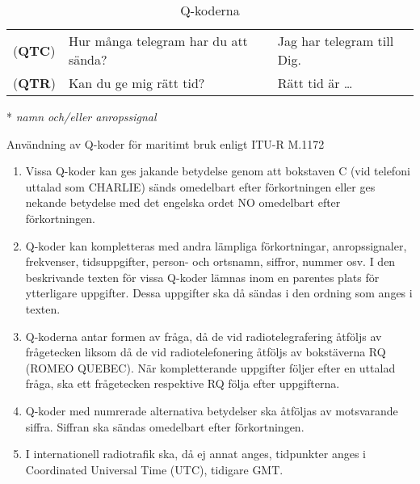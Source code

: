 \begin{table*}
\begin{threeparttable}
\begin{tabular}{lp{6cm}p{6cm}}
    (\textbf{QTC}) & Hur många telegram har du att sända? & Jag har telegram till Dig. \\
    (\textbf{QTR}) & Kan du ge mig rätt tid? & Rätt tid är \dots \\
  \end{tabular}
  \vspace{1em}
  \begin{tablenotes}
  \item [*] \emph{namn och/eller anropssignal}
  \end{tablenotes}
  \end{threeparttable}
  \caption{Q-koderna}
	\label{tab:q-kod}
\end{table*}

Användning av Q-koder för maritimt bruk enligt ITU-R M.1172
\begin{enumerate}
	\item Vissa Q-koder kan ges jakande betydelse genom att bokstaven C
	(vid telefoni uttalad som CHARLIE) sänds omedelbart efter
	förkortningen eller ges nekande betydelse med det engelska ordet NO
	omedelbart efter förkortningen.
	\item Q-koder kan kompletteras med andra lämpliga förkortningar,
	anropssignaler, frekvenser, tidsuppgifter, person- och ortsnamn,
	siffror, nummer osv. I den beskrivande texten för vissa Q-koder
	lämnas inom en parentes plats för ytterligare uppgifter. Dessa
	uppgifter ska då sändas i den ordning som anges i texten.
	\item Q-koderna antar formen av fråga, då de vid radiotelegrafering
	åtföljs av frågetecken liksom då de vid radiotelefonering åtföljs av
	bokstäverna RQ (ROMEO QUEBEC). När kompletterande uppgifter följer
	efter en uttalad fråga, ska ett frågetecken respektive RQ följa
	efter uppgifterna.
	\item Q-koder med numrerade alternativa betydelser ska åtföljas av
	motsvarande siffra. Siffran ska sändas omedelbart efter
	förkortningen.
	\item I internationell radiotrafik ska, då ej annat anges,
	tidpunkter anges i Coordinated Universal Time (UTC), tidigare GMT.
\end{enumerate}
